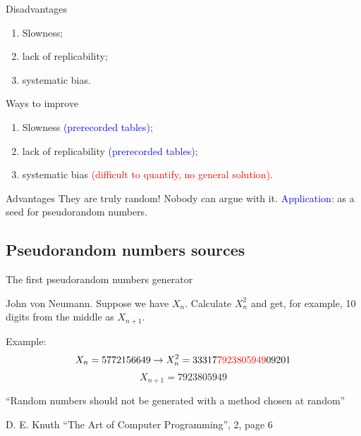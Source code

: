 \documentclass[12pt]{beamer}
\begin{document}
 \begin{frame}{Disadvantages}
  \begin{enumerate}
   \item Slowness;
   \pause
   \item lack of replicability;
   \pause
   \item systematic bias.
  \end{enumerate}

 \end{frame}

\begin{frame}{Ways to improve}
  \begin{enumerate}
   \item Slowness \textcolor{blue}{(prerecorded tables)};
   \pause
   \item lack of replicability \textcolor{blue}{(prerecorded tables)}; 
   \pause
   \item systematic bias \textcolor{red}{(difficult to quantify, no general solution)}.
  \end{enumerate}
  \end{frame}

\begin{frame}{Advantages}
They are truly random! Nobody can argue with it.
\newline
%
\newline
\textcolor{blue}{Application:} as a seed for pseudorandom numbers.
 \end{frame}

 \subsection{Pseudorandom numbers sources}
 \begin{frame}{The first pseudorandom numbers generator}
  \begin{block}{John von Neumann.}
   Suppose we have $X_n$. Calculate $X_n^2$ and get, for example, 10 digits from the middle as $X_{n+1}$. 
  \end{block}
  Example:
  $$X_n = 5772156649 \rightarrow X_n^2 = 33317\textcolor{red}{7923805949}09201$$
  $$X_{n+1} = 7923805949$$
  \end{frame}
  \begin{frame}{}
  ``Random numbers should not be generated with a method chosen at random''
\begin{flushright}
 {\small 
 D. E. Knuth ``The Art of Computer Programming'', 2, page 6
 }
\end{flushright}
 \end{frame}
\end{document}
